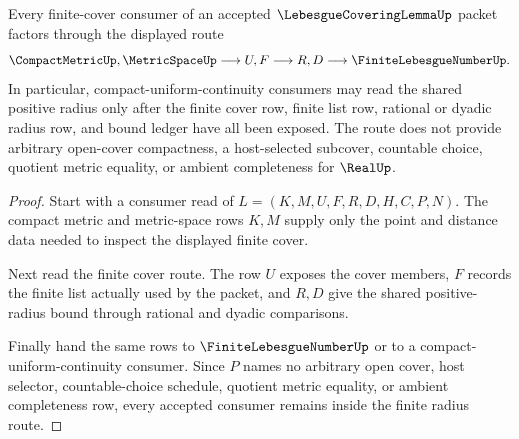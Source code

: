 \begin{theorem}
\label{thm:lebesgue-covering-lemma-finite-radius-bound}
Every finite-cover consumer of an accepted $\LebesgueCoveringLemmaUp$ packet factors through the displayed route
$$
\CompactMetricUp,\MetricSpaceUp\longrightarrow U,F\longrightarrow R,D\longrightarrow \FiniteLebesgueNumberUp .
$$
In particular, compact-uniform-continuity consumers may read the shared positive radius only after the finite cover row, finite list row, rational or dyadic radius row, and bound ledger have all been exposed. The route does not provide arbitrary open-cover compactness, a host-selected subcover, countable choice, quotient metric equality, or ambient completeness for $\RealUp$.
\end{theorem}
\begin{proof}
Start with a consumer read of $L=(K,M,U,F,R,D,H,C,P,N)$. The compact metric and metric-space rows $K,M$ supply only the point and distance data needed to inspect the displayed finite cover.

Next read the finite cover route. The row $U$ exposes the cover members, $F$ records the finite list actually used by the packet, and $R,D$ give the shared positive-radius bound through rational and dyadic comparisons.

Finally hand the same rows to $\FiniteLebesgueNumberUp$ or to a compact-uniform-continuity consumer. Since $P$ names no arbitrary open cover, host selector, countable-choice schedule, quotient metric equality, or ambient completeness row, every accepted consumer remains inside the finite radius route.
\end{proof}


\begin{closurestatus}{\LebesgueCoveringLemmaUp}
  \theoryclosure{\seedClosure}
  \formalstatus{\unformalizedV}
\end{closurestatus}
